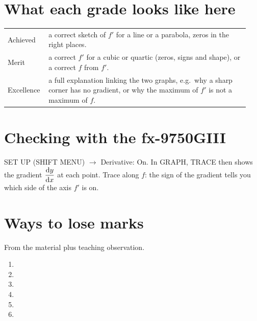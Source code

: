 \documentclass[11pt]{article}
\begin{document}
\section{What each grade looks like here}\label{grades}
\begin{tabular}{@{}p{0.14\linewidth}p{0.80\linewidth}@{}}
\toprule
Achieved & a correct sketch of $f'$ for a line or a parabola, zeros in the right places.\\
Merit & a correct $f'$ for a cubic or quartic (zeros, signs and shape), or a correct $f$ from $f'$.\\
Excellence & a full explanation linking the two graphs, e.g.\ why a sharp corner has no gradient, or why the maximum of $f'$ is not a maximum of $f$.\\
\bottomrule
\end{tabular}

\section{Checking with the fx-9750GIII}\label{calc}
\textsf{SET UP} (SHIFT MENU) $\to$ \textsf{Derivative: On}. In \textsf{GRAPH}, \textsf{TRACE} then shows the gradient $\dfrac{\mathrm{d}y}{\mathrm{d}x}$ at each point.
Trace along $f$: the sign of the gradient tells you which side of the axis $f'$ is on.

\section{Ways to lose marks}\label{lose}
From the material plus teaching observation.
\begin{enumerate}[leftmargin=7mm, itemsep=2pt]
\item[\textbf{\lmnum{tpcopy}}] 
\item[\textbf{\lmnum{sign}}] 
\item[\textbf{\lmnum{degree}}] 
\item[\textbf{\lmnum{steep}}] 
\item[\textbf{\lmnum{roots}}] 
\item[\textbf{\lmnum{marks}}] 
\end{enumerate}
\end{document}
